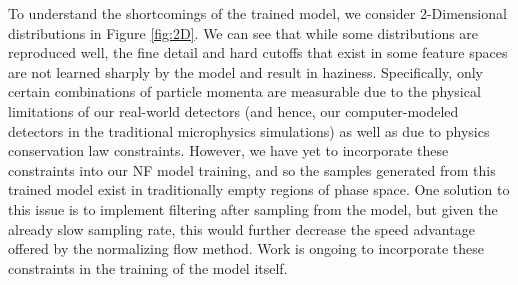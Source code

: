 \documentclass[conference]{IEEEtran}
\begin{document}
To understand the shortcomings of the trained model, we consider 2-Dimensional distributions in  Figure \ref{fig:2D}. We can see that while some distributions are reproduced well, the fine detail and hard cutoffs that exist in some feature spaces are not learned sharply by the model and result in haziness. Specifically, only certain combinations of particle momenta are measurable due to the physical limitations of our real-world detectors (and hence, our computer-modeled detectors in the traditional microphysics simulations) as well as due to physics conservation law constraints. However, we have yet to incorporate these constraints into our NF model training, and so the samples generated from this trained model exist in traditionally empty regions of phase space. One solution to this issue is to implement filtering after sampling from the model, but given the already slow sampling rate, this would further decrease the speed advantage offered by the normalizing flow method. Work is ongoing to incorporate these constraints in the training of the model itself.
\end{document}

